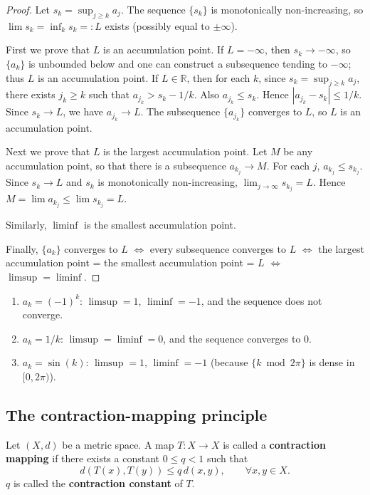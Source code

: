 \begin{proof}
Let $s_k = \sup_{j \ge k} a_j$. The sequence $\{s_k\}$ is monotonically non-increasing, so $\lim s_k = \inf_k s_k =: L$ exists (possibly equal to $\pm\infty$).

First we prove that $L$ is an accumulation point. If $L = -\infty$, then $s_k \to -\infty$, so $\{a_k\}$ is unbounded below and one can construct a subsequence tending to $-\infty$; thus $L$ is an accumulation point. If $L \in \mathbb{R}$, then for each $k$, since $s_k = \sup_{j \ge k} a_j$, there exists $j_k \ge k$ such that $a_{j_k} > s_k - 1/k$. Also $a_{j_k} \le s_k$. Hence $|a_{j_k} - s_k| \le 1/k$. Since $s_k \to L$, we have $a_{j_k} \to L$. The subsequence $\{a_{j_k}\}$ converges to $L$, so $L$ is an accumulation point.

Next we prove that $L$ is the largest accumulation point. Let $M$ be any accumulation point, so that there is a subsequence $a_{k_j} \to M$. For each $j$, $a_{k_j} \le s_{k_j}$. Since $s_k \to L$ and $s_k$ is monotonically non-increasing, $\lim_{j \to \infty} s_{k_j} = L$. Hence $M = \lim a_{k_j} \le \lim s_{k_j} = L$.

Similarly, $\liminf$ is the smallest accumulation point.

Finally, $\{a_k\}$ converges to $L$ $\iff$ every subsequence converges to $L$ $\iff$ the largest accumulation point = the smallest accumulation point = $L$ $\iff$ $\limsup = \liminf$.
\end{proof}

\begin{example}\label{ex:limsup_example}
\begin{enumerate}[label=(\roman*)]
    \item $a_k = (-1)^k$: $\limsup = 1$, $\liminf = -1$, and the sequence does not converge.
    \item $a_k = 1/k$: $\limsup = \liminf = 0$, and the sequence converges to $0$.
    \item $a_k = \sin(k)$: $\limsup = 1$, $\liminf = -1$ (because $\{k \bmod 2\pi\}$ is dense in $[0, 2\pi)$).
\end{enumerate}
\end{example}

\subsection{The contraction-mapping principle}

\begin{definition}\label{def:contraction_mapping}
Let $(X, d)$ be a metric space. A map $T: X \to X$ is called a \textbf{contraction mapping} if there exists a constant $0 \le q < 1$ such that
\[
d(T(x), T(y)) \le q \, d(x, y), \qquad \forall x, y \in X.
\]
$q$ is called the \textbf{contraction constant} of $T$.
\end{definition}

